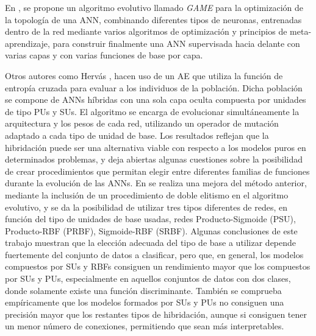 En \cite{Kordik2010}, se propone un algoritmo evolutivo llamado \textit{GAME} para la
optimización de la topología de una ANN, combinando diferentes tipos de neuronas,
entrenadas dentro de la red mediante varios algoritmos de optimización y principios de
meta-aprendizaje, para construir finalmente una ANN supervisada hacia delante con varias
capas y con varias funciones de base por capa.

Otros autores como Hervás \cite{Hervas2007,Hervas2007a}, hacen uso de
un AE que utiliza la función de entropía cruzada para evaluar a los
individuos de la población. Dicha población se compone de ANNs híbridas con una sola
capa oculta compuesta por unidades de tipo PUs y SUs. El algoritmo se encarga
de evolucionar simultáneamente la arquitectura y los pesos de cada red, utilizando un
operador de mutación adaptado a cada tipo de unidad de base. Los resultados
reflejan que la hibridación puede ser una alternativa viable con respecto a los
modelos puros en determinados problemas, y deja abiertas algunas cuestiones sobre
la posibilidad de crear procedimientos que permitan elegir
entre diferentes familias de funciones durante la evolución de las ANNs.
En \cite{Gutierrez2007,Gutierrez2009} se realiza una mejora del método anterior,
mediante la inclusión de un procedimiento de doble elitismo en el algoritmo evolutivo, y se da
 la posibilidad de utilizar tres tipos diferentes de redes, en función del tipo de
unidades de base usadas, redes Producto-Sigmoide (PSU), Producto-RBF (PRBF),
Sigmoide-RBF (SRBF). Algunas conclusiones de este trabajo
muestran que la elección adecuada del tipo de base a utilizar depende fuertemente del
conjunto de datos a clasificar, pero que, en general, los modelos compuestos por SUs y RBFs
consiguen un rendimiento mayor que los compuestos por SUs y PUs, especialmente en aquellos
conjuntos de datos con dos clases, donde solamente existe una función discriminante.
También se comprueba empíricamente que los modelos formados por SUs y PUs no consiguen una
precisión mayor que los restantes tipos de hibridación, aunque si consiguen tener un menor
número de conexiones, permitiendo que sean más interpretables.

